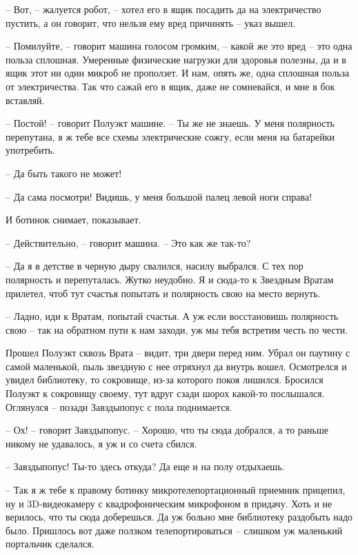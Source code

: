 \documentclass[ebook,oneside,final,openright]{memoir}
\begin{document}
– Вот, – жалуется робот, – хотел его в ящик посадить да на электричество пустить, а он говорит, что нельзя ему вред причинять – указ вышел. \par
– Помилуйте, – говорит машина голосом громким, – какой же это вред – это одна польза сплошная. Умеренные физические нагрузки для здоровья полезны, да и в ящик этот ни один микроб не проползет. И нам, опять же, одна сплошная польза от электричества. Так что сажай его в ящик, даже не сомневайся, и мне в бок вставляй. \par
– Постой! – говорит Полуэкт машине. – Ты же не знаешь. У меня полярность перепутана, я ж тебе все схемы электрические сожгу, если меня на батарейки употребить. \par
– Да быть такого не может! \par
– Да сама посмотри! Видишь, у меня большой палец левой ноги справа! \par
И ботинок снимает, показывает. \par
– Действительно, – говорит машина. – Это как же так-то? \par
– Да я в детстве в черную дыру свалился, насилу выбрался. С тех пор полярность и перепуталась. Жутко неудобно. Я и сюда-то к Звездным Вратам прилетел, чтоб тут счастья попытать и полярность свою на место вернуть. \par
– Ладно, иди к Вратам, попытай счастья. А уж если восстановишь полярность свою – так на обратном пути к нам заходи, уж мы тебя встретим честь по чести.\par
\par
Прошел Полуэкт сквозь Врата – видит, три двери перед ним. Убрал он паутину с самой маленькой, пыль звездную с нее отряхнул да внутрь вошел. Осмотрелся и увидел библиотеку, то сокровище, из-за которого покоя лишился. Бросился Полуэкт к сокровищу своему, тут вдруг сзади шорох какой-то послышался. Оглянулся – позади Завздыпопус с пола поднимается.\par
– Ох! – говорит Завздыпопус. – Хорошо, что ты сюда добрался, а то раньше никому не удавалось, я уж и со счета сбился.\par
– Завздыпопус! Ты-то здесь откуда? Да еще и на полу отдыхаешь.\par
– Так я ж тебе к правому ботинку микротелепортационный приемник прицепил, ну и 3D-видеокамеру с квадрофоническим микрофоном в придачу. Хоть и не верилось, что ты сюда доберешься. Да уж больно мне библиотеку раздобыть надо было. Пришлось вот даже ползком телепортироваться – слишком уж маленький портальчик сделался.\par
\end{document}

